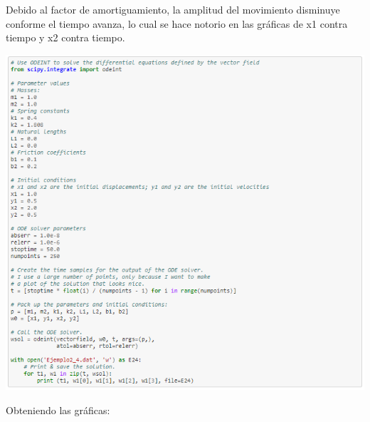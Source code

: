 \documentclass{article}
\begin{document}
Debido al factor de amortiguamiento, la amplitud del movimiento disminuye conforme el tiempo avanza, lo cual se hace notorio en las gráficas de x1 contra tiempo y x2 contra tiempo.
\begin{center}
    \includegraphics[width=.9\textwidth]{Datos4.PNG}
\end{center}
Obteniendo las gráficas:
\end{document}
